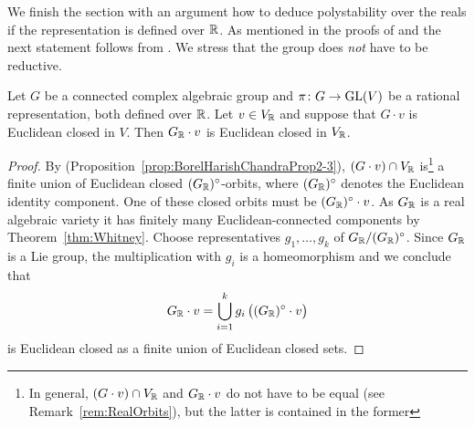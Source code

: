 \medskip

We finish the section with an argument how to deduce polystability over the reals if the representation is defined over $\mathbb R$.
As mentioned in the proofs of \cite[Corollary~5.3]{birkes1971orbits} and \cite[Proposition~2.21]{DM21MatrixNormal} the next statement follows from \cite[Proposition~2.3]{BorelHarishChandra}.
We stress that the group does \emph{not} have to be reductive.

\begin{lemma}\label{lem:PopovForReal}
	Let $G$ be a connected complex algebraic group and $\pi \colon G \to \operatorname{GL}(V)$ be a rational representation, both defined over $\mathbb R$. Let $v \in V_\mathbb R$ and suppose that $G \cdot v$ is Euclidean closed in $V$. Then $G_{\mathbb R} \cdot v$ is Euclidean closed in $V_\mathbb R$.
\end{lemma}

\begin{proof} %
	By \cite[Proposition~2.3]{BorelHarishChandra} (Proposition~\ref{prop:BorelHarishChandraProp2-3}), $(G \cdot v) \cap V_\mathbb R$ is\footnote{In general, $(G \cdot v) \cap V_\mathbb R$ and $G_\mathbb R \cdot v$ do not have to be equal (see Remark~\ref{rem:RealOrbits}), but the latter is contained in the former}
	a finite union of Euclidean closed $(G_{\mathbb R})^\circ$-orbits, where $(G_{\mathbb R})^\circ$ denotes the Euclidean identity component. One of these closed orbits must be $(G_\mathbb R)^\circ \cdot v$. As $G_\mathbb R$ is a real algebraic variety it has finitely many Euclidean-connected components by Theorem~\ref{thm:Whitney}.
	Choose representatives $g_1, \ldots, g_k$ of $G_{\mathbb R} / (G_\mathbb R)^\circ$. Since $G_\mathbb R$ is a Lie group, the multiplication with $g_i$ is a homeomorphism and we conclude that
		\[ G_\mathbb R \cdot v = \bigcup_{i=1}^k g_i \, \big( (G_\mathbb R)^\circ \cdot v \big)\]
	is Euclidean closed as a finite union of Euclidean closed sets.
\end{proof}



















